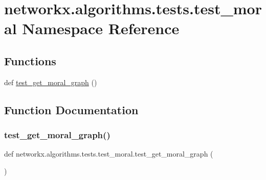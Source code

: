 \hypertarget{namespacenetworkx_1_1algorithms_1_1tests_1_1test__moral}{}\section{networkx.\+algorithms.\+tests.\+test\+\_\+moral Namespace Reference}
\label{namespacenetworkx_1_1algorithms_1_1tests_1_1test__moral}
\subsection*{Functions}
\begin{DoxyCompactItemize}
\item 
def \hyperlink{namespacenetworkx_1_1algorithms_1_1tests_1_1test__moral_aefe1e6ed341648530b1cb535b1f90f9f}{test\+\_\+get\+\_\+moral\+\_\+graph} ()
\end{DoxyCompactItemize}


\subsection{Function Documentation}
\mbox{\label{namespacenetworkx_1_1algorithms_1_1tests_1_1test__moral_aefe1e6ed341648530b1cb535b1f90f9f}} 
\subsubsection{\texorpdfstring{test\+\_\+get\+\_\+moral\+\_\+graph()}{test\_get\_moral\_graph()}}
{\footnotesize\ttfamily def networkx.\+algorithms.\+tests.\+test\+\_\+moral.\+test\+\_\+get\+\_\+moral\+\_\+graph (\begin{DoxyParamCaption}{ }\end{DoxyParamCaption})}

